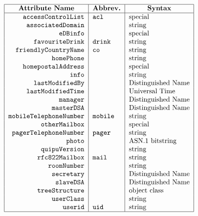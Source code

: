 
\smaller

\[\begin{tabular}{|r|l|l|}
\hline
\multicolumn{1}{|c|}{\bf Attribute Name}&
	\multicolumn{1}{c|}{\bf Abbrev.}&
			\multicolumn{1}{c|}{\bf Syntax}\\
\hline
\verb"accessControlList"&\verb"acl"&special\\
\verb"associatedDomain"&&string\\
\verb"eDBinfo"&&special\\
\verb"favouriteDrink"&\verb"drink"&string\\
\verb"friendlyCountryName"&\verb"co"&string\\
\verb"homePhone"&&string\\
\verb"homepostalAddress"&&special\\
\verb"info"&&string\\
\verb"lastModifiedBy"&&Distinguished Name\\
\verb"lastModifiedTime"&& Universal Time\\
\verb"manager"&&Distinguished Name\\
\verb"masterDSA"&&Distinguished Name\\
\verb"mobileTelephoneNumber"&\verb"mobile"&string\\
\verb"otherMailbox"&&special\\
\verb"pagerTelephoneNumber"&\verb"pager"&string\\
\verb"photo"&&ASN.1 bitstring\\
\verb"quipuVersion"&&string\\
\verb"rfc822Mailbox"&\verb"mail"&string\\
\verb"roomNumber"&&string\\
\verb"secretary"&&Distinguished Name\\
\verb"slaveDSA"&&Distinguished Name\\
\verb"treeStructure"&&object class\\
\verb"userClass"&&string\\
\verb"userid"&\verb"uid"&string\\
\hline
\end{tabular}\]
